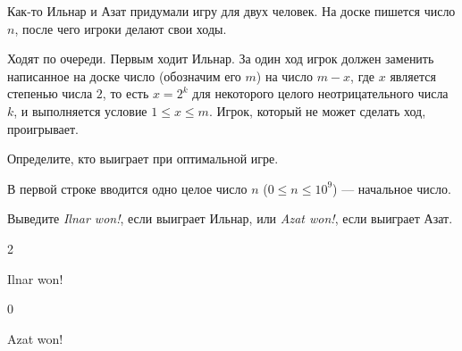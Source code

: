 
Как-то Ильнар и Азат придумали игру для двух человек. На доске пишется число $n$, после чего игроки делают свои ходы.

Ходят по очереди. Первым ходит Ильнар. За один ход игрок должен заменить написанное на доске число (обозначим его $m$) на число $m-x$, где $x$ является степенью числа $2$, то есть $x = 2^k$ для некоторого целого неотрицательного числа $k$, и выполняется условие $1 \le x \le m$. Игрок, который не может сделать ход, проигрывает.

Определите, кто выиграет при оптимальной игре.


В первой строке вводится одно целое число $n$ ($0 \le n \le 10^9$) — начальное число.

\outputfmtSection

Выведите \textit{Ilnar won!}, если выиграет Ильнар, или \textit{Azat won!}, если выиграет Азат.

\exampleSection


\begin{myverbbox}[\small]{\vinput}
2
\end{myverbbox}
\begin{myverbbox}[\small]{\voutput}
Ilnar won!
\end{myverbbox}


\begin{myverbbox}[\small]{\vinput}
0
\end{myverbbox}
\begin{myverbbox}[\small]{\voutput}
Azat won!
\end{myverbbox}


